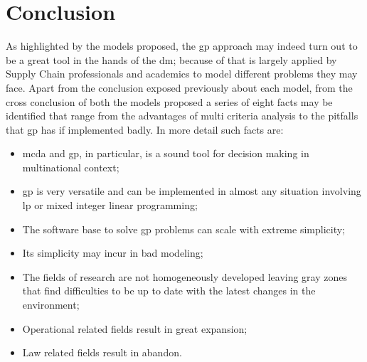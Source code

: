 \clearpage{\pagestyle{empty}\cleardoublepage}
\chapter*{Conclusion}

\begin{doublespace}
	As highlighted by the models proposed, the \gls{gp} approach may indeed turn out to be a great tool in the hands of the \gls{dm}; because of that is largely applied by Supply Chain professionals and academics to model different problems they may face. Apart from the conclusion exposed previously about each model, from the cross conclusion of both the models proposed a series of eight facts may be identified that range from the advantages of multi criteria analysis to the pitfalls that \gls{gp} has if implemented badly. In more detail such facts are:

\begin{itemize}
	\item \gls{mcda} and \gls{gp}, in particular, is a sound tool for decision making in multinational context;
	\item \gls{gp} is very versatile and can be implemented in almost any situation involving \gls{lp} or mixed integer linear programming;
	\item The software base to solve \gls{gp} problems can scale with extreme simplicity;
    \item Its simplicity may incur in bad modeling;
    \item The fields of research are not homogeneously developed leaving gray zones that find difficulties to be up to date with the latest changes in the environment;
    \item Operational related fields result in great expansion;
    \item Law related fields result in abandon.
\end{itemize}


\end{doublespace}
